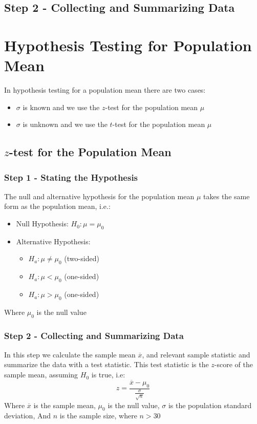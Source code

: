 \documentclass[12pt letter]{report}
\begin{document}
\subsection{Step 2 - Collecting and Summarizing Data}

\section{Hypothesis Testing for Population Mean}

In hypothesis testing for a population mean there are two cases:
\begin{itemize}
  \item $\sigma $ is known and we use the $z$-test for the population mean $\mu $
  \item $\sigma $ is unknown and we use the $t$-test for the population mean $\mu $
\end{itemize}

\subsection{$z$-test for the Population Mean}

\subsubsection{Step 1 - Stating the Hypothesis}
The null and alternative hypothesis for the population mean $\mu $ takes the same form as the population mean,
i.e.:
\begin{itemize}
  \item Null Hypothesis: $H_0: \mu = \mu_0$
  \item Alternative Hypothesis:
        \begin{itemize}
          \item $H_a: \mu \neq \mu_0$ (two-sided)
          \item $H_a: \mu < \mu_0$ (one-sided)
          \item $H_a: \mu > \mu_0$ (one-sided)
        \end{itemize}
\end{itemize}
Where $\mu_0$ is the null value

\subsubsection{Step 2 - Collecting and Summarizing Data}

In this step we calculate the sample mean $\overline{x}$, and relevant sample statistic and summarize the data with a
test statistic. This test statistic is the $z$-score of the sample mean, assuming $H_0$ is true, i.e:
\[
  z = \frac{\overline{x} - \mu_0}{\frac{\sigma}{\sqrt{n}}}
\]
Where $\overline{x}$ is the sample mean, $\mu_0$ is the null value, $\sigma $ is the population standard deviation, And
$n$ is the sample size, where $n > 30$
\end{document}
